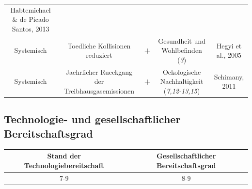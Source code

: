 \documentclass[
]{book}
\begin{document}
\begin{longtable}[]{@{}ccccc@{}}
\begin{minipage}[t]{0.17\columnwidth}
Habtemichael \& de Picado Santos, 2013\strut
\end{minipage}\tabularnewline
\begin{minipage}[t]{0.17\columnwidth}\centering
Systemisch\strut
\end{minipage} & \begin{minipage}[t]{0.16\columnwidth}\centering
Toedliche Kollisionen reduziert\strut
\end{minipage} & \begin{minipage}[t]{0.17\columnwidth}\centering
\textbf{+}\strut
\end{minipage} & \begin{minipage}[t]{0.17\columnwidth}\centering
Gesundheit und Wohlbefinden (\emph{3})\strut
\end{minipage} & \begin{minipage}[t]{0.17\columnwidth}\centering
Hegyi et al., 2005\strut
\end{minipage}\tabularnewline
\begin{minipage}[t]{0.17\columnwidth}\centering
Systemisch\strut
\end{minipage} & \begin{minipage}[t]{0.16\columnwidth}\centering
Jaehrlicher Rueckgang der Treibhausgasemissionen\strut
\end{minipage} & \begin{minipage}[t]{0.17\columnwidth}\centering
\textbf{+}\strut
\end{minipage} & \begin{minipage}[t]{0.17\columnwidth}\centering
Oekologische Nachhaltigkeit (\emph{7,12-13,15})\strut
\end{minipage} & \begin{minipage}[t]{0.17\columnwidth}\centering
Schimany, 2011\strut
\end{minipage}\tabularnewline
\bottomrule
\end{longtable}

\hypertarget{technologie--und-gesellschaftlicher-bereitschaftsgrad-12}{%
\subsection*{Technologie- und gesellschaftlicher Bereitschaftsgrad}\label{technologie--und-gesellschaftlicher-bereitschaftsgrad-12}}

\begin{longtable}[]{@{}cc@{}}
\toprule
Stand der Technologiebereitschaft & Gesellschaftlicher Bereitschaftsgrad\tabularnewline
\midrule
\endhead
7-9 & 8-9\tabularnewline
\bottomrule
\end{longtable}
\end{document}
